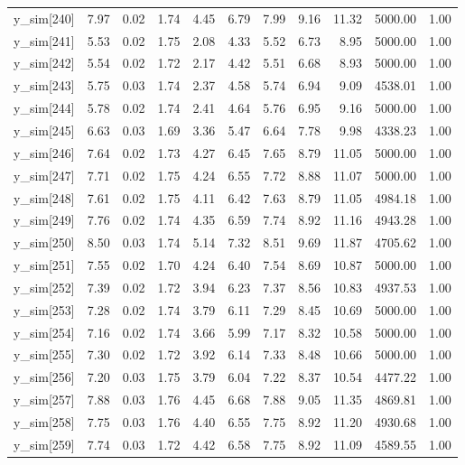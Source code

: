 \begin{table}[ht]
\begin{tabular}{rrrrrrrrrrr}
  y\_sim[240] & 7.97 & 0.02 & 1.74 & 4.45 & 6.79 & 7.99 & 9.16 & 11.32 & 5000.00 & 1.00 \\ 
  y\_sim[241] & 5.53 & 0.02 & 1.75 & 2.08 & 4.33 & 5.52 & 6.73 & 8.95 & 5000.00 & 1.00 \\ 
  y\_sim[242] & 5.54 & 0.02 & 1.72 & 2.17 & 4.42 & 5.51 & 6.68 & 8.93 & 5000.00 & 1.00 \\ 
  y\_sim[243] & 5.75 & 0.03 & 1.74 & 2.37 & 4.58 & 5.74 & 6.94 & 9.09 & 4538.01 & 1.00 \\ 
  y\_sim[244] & 5.78 & 0.02 & 1.74 & 2.41 & 4.64 & 5.76 & 6.95 & 9.16 & 5000.00 & 1.00 \\ 
  y\_sim[245] & 6.63 & 0.03 & 1.69 & 3.36 & 5.47 & 6.64 & 7.78 & 9.98 & 4338.23 & 1.00 \\ 
  y\_sim[246] & 7.64 & 0.02 & 1.73 & 4.27 & 6.45 & 7.65 & 8.79 & 11.05 & 5000.00 & 1.00 \\ 
  y\_sim[247] & 7.71 & 0.02 & 1.75 & 4.24 & 6.55 & 7.72 & 8.88 & 11.07 & 5000.00 & 1.00 \\ 
  y\_sim[248] & 7.61 & 0.02 & 1.75 & 4.11 & 6.42 & 7.63 & 8.79 & 11.05 & 4984.18 & 1.00 \\ 
  y\_sim[249] & 7.76 & 0.02 & 1.74 & 4.35 & 6.59 & 7.74 & 8.92 & 11.16 & 4943.28 & 1.00 \\ 
  y\_sim[250] & 8.50 & 0.03 & 1.74 & 5.14 & 7.32 & 8.51 & 9.69 & 11.87 & 4705.62 & 1.00 \\ 
  y\_sim[251] & 7.55 & 0.02 & 1.70 & 4.24 & 6.40 & 7.54 & 8.69 & 10.87 & 5000.00 & 1.00 \\ 
  y\_sim[252] & 7.39 & 0.02 & 1.72 & 3.94 & 6.23 & 7.37 & 8.56 & 10.83 & 4937.53 & 1.00 \\ 
  y\_sim[253] & 7.28 & 0.02 & 1.74 & 3.79 & 6.11 & 7.29 & 8.45 & 10.69 & 5000.00 & 1.00 \\ 
  y\_sim[254] & 7.16 & 0.02 & 1.74 & 3.66 & 5.99 & 7.17 & 8.32 & 10.58 & 5000.00 & 1.00 \\ 
  y\_sim[255] & 7.30 & 0.02 & 1.72 & 3.92 & 6.14 & 7.33 & 8.48 & 10.66 & 5000.00 & 1.00 \\ 
  y\_sim[256] & 7.20 & 0.03 & 1.75 & 3.79 & 6.04 & 7.22 & 8.37 & 10.54 & 4477.22 & 1.00 \\ 
  y\_sim[257] & 7.88 & 0.03 & 1.76 & 4.45 & 6.68 & 7.88 & 9.05 & 11.35 & 4869.81 & 1.00 \\ 
  y\_sim[258] & 7.75 & 0.03 & 1.76 & 4.40 & 6.55 & 7.75 & 8.92 & 11.20 & 4930.68 & 1.00 \\ 
  y\_sim[259] & 7.74 & 0.03 & 1.72 & 4.42 & 6.58 & 7.75 & 8.92 & 11.09 & 4589.55 & 1.00 \\ 

\end{tabular}
\end{table}
